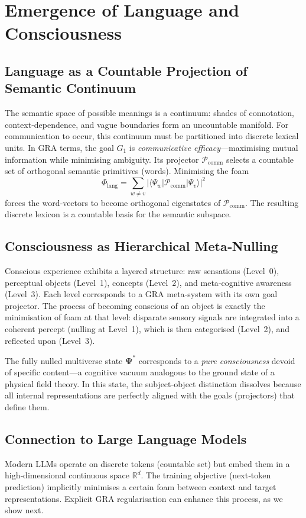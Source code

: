 \documentclass[11pt]{article}
\newcommand{\cP}{\mathcal{P}}
\begin{document}
\section{Emergence of Language and Consciousness}
\label{sec:emergence}

\subsection{Language as a Countable Projection of Semantic Continuum}
The semantic space of possible meanings is a continuum: shades of connotation, context‑dependence, and vague boundaries form an uncountable manifold. For communication to occur, this continuum must be partitioned into discrete lexical units. In GRA terms, the goal $G_1$ is \emph{communicative efficacy}---maximising mutual information while minimising ambiguity. Its projector $\cP_{\text{comm}}$ selects a countable set of orthogonal semantic primitives (words). Minimising the foam
\[
\Phi_{\text{lang}} = \sum_{w \neq v} \bigl| \langle \Psi_w | \cP_{\text{comm}} | \Psi_v \rangle \bigr|^2
\]
forces the word‑vectors to become orthogonal eigenstates of $\cP_{\text{comm}}$. The resulting discrete lexicon is a countable basis for the semantic subspace.

\subsection{Consciousness as Hierarchical Meta‑Nulling}
Conscious experience exhibits a layered structure: raw sensations (Level~0), perceptual objects (Level~1), concepts (Level~2), and meta‑cognitive awareness (Level~3). Each level corresponds to a GRA meta‑system with its own goal projector. The process of becoming conscious of an object is exactly the minimisation of foam at that level: disparate sensory signals are integrated into a coherent percept (nulling at Level~1), which is then categorised (Level~2), and reflected upon (Level~3).

The fully nulled multiverse state $\mathbf{\Psi}^*$ corresponds to a \emph{pure consciousness} devoid of specific content---a cognitive vacuum analogous to the ground state of a physical field theory. In this state, the subject‑object distinction dissolves because all internal representations are perfectly aligned with the goals (projectors) that define them.

\subsection{Connection to Large Language Models}
Modern LLMs operate on discrete tokens (countable set) but embed them in a high‑dimensional continuous space $\mathbb{R}^d$. The training objective (next‑token prediction) implicitly minimises a certain foam between context and target representations. Explicit GRA regularisation can enhance this process, as we show next.
\end{document}
